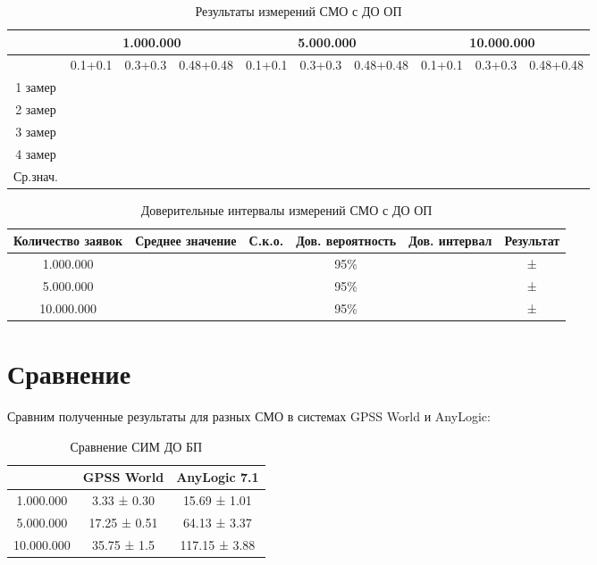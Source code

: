 \documentclass[a4paper,14pt]{report} %
\begin{document}
\begin{table}[h!]
\caption{Результаты измерений СМО с ДО ОП}
\begin{tabular}{|c|c|c|c|c|c|c|c|c|c|}
\hline
 & \multicolumn{3}{|c|}{1.000.000} & \multicolumn{3}{|c|}{5.000.000} & \multicolumn{3}{|c|}{10.000.000} \\
\hline
 & 0.1+0.1 & 0.3+0.3 & 0.48+0.48 & 0.1+0.1 & 0.3+0.3 & 0.48+0.48 & 0.1+0.1 & 0.3+0.3 & 0.48+0.48 \\
\hline
1 замер &  &  &  &  &  &  &  &  &   \\
\hline
2 замер &  &  &  &  &  &  &  &  &  \\
\hline
3 замер &  &  &  &  &  &  &  &  &   \\
\hline
4 замер &  &  &  &  &  &  &  &  & \\
\hline
Ср.знач. &   &  &  &  &  &  &  &  &  \\
\hline
\end{tabular}
\end{table} 

\begin{table}[h!]
\caption{Доверительные интервалы измерений СМО с ДО ОП}
\begin{tabular}{|c|c|c|c|c|c|}
\hline
 Количество заявок & Среднее значение & С.к.о. & Дов. вероятность & Дов. интервал & Результат\\
\hline
1.000.000 &  &  & 95\% &  &  ±  \\
\hline
5.000.000 &  &  & 95\% & &  ±  \\
\hline
10.000.000 &  &  & 95\% & &  ±  \\
\hline
\end{tabular}
\end{table} 
\section{Сравнение}
Сравним полученные результаты для разных СМО в системах GPSS World и AnyLogic: 

\begin{table}[h!]
\caption{Сравнение СИМ ДО БП}
\begin{tabular}{|c|c|c|}
\hline
 & GPSS World & AnyLogic 7.1 \\
\hline
1.000.000 & 3.33 ± 0.30 & 15.69 ± 1.01 \\
\hline
5.000.000 & 17.25 ± 0.51 & 64.13 ± 3.37 \\
\hline
10.000.000 & 35.75 ± 1.5 & 117.15 ± 3.88 \\
\hline
\end{tabular}
\end{table} 
\end{document}
